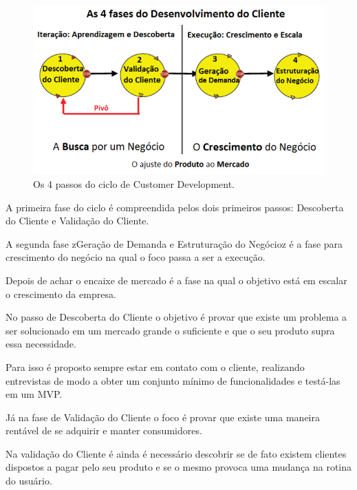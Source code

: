 \begin{figure}[htb]
\centering
\includegraphics[width=15cm]{figuras/customerdevelopment}
\caption{\label{fig:customerdevelopment}Os 4 passos do ciclo de Customer Development.}
\end{figure}
\par A primeira fase do ciclo é compreendida pelos dois primeiros passos: Descoberta do Cliente e Validação do Cliente.
\par A segunda fase zGeração de Demanda e Estruturação do Negócioz é a fase para crescimento do negócio na qual o foco passa a ser a execução.
\par Depois de achar o encaixe de mercado é a fase na qual o objetivo está em escalar o crescimento da empresa.
\par No passo de Descoberta do Cliente o objetivo é provar que existe um problema a ser solucionado em um mercado grande o suficiente e que o seu produto supra essa necessidade.
\par Para isso é proposto sempre estar em contato com o cliente, realizando entrevistas de modo a obter um conjunto mínimo de funcionalidades e testá-las em um MVP.
\par Já na fase de Validação do Cliente o foco é provar que existe uma maneira rentável de se adquirir e manter consumidores.
\par Na validação do Cliente é ainda é necessário descobrir se de fato existem clientes dispostos a pagar pelo seu produto e se o mesmo provoca uma mudança na rotina do usuário.
